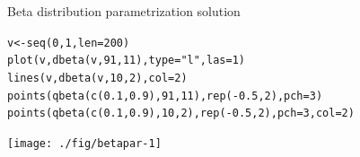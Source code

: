 \documentclass[xcolor=table,           xcolor=dvipsnames]{beamer}\usepackage[]{graphicx}\usepackage[]{color}
\makeatletter
\newcommand{\hlnum}[1]{\textcolor[rgb]{0,0,0}{#1}}
\newcommand{\hlstr}[1]{\textcolor[rgb]{0.545,0.137,0.137}{#1}}
\newcommand{\hlopt}[1]{\textcolor[rgb]{0,0,0}{#1}}
\newcommand{\hlstd}[1]{\textcolor[rgb]{0,0,0}{#1}}
\newcommand{\hlkwb}[1]{\textcolor[rgb]{0,0,0}{#1}}
\newcommand{\hlkwc}[1]{\textcolor[rgb]{1,0,1}{#1}}
\newcommand{\hlkwd}[1]{\textcolor[rgb]{0,0,1}{#1}}
\newenvironment{kframe}{%
 \def\at@end@of@kframe{}%
 \ifinner\ifhmode%
  \def\at@end@of@kframe{\end{minipage}}%
  \begin{minipage}{\columnwidth}%
 \fi\fi%
 \def\FrameCommand##1{\hskip\@totalleftmargin \hskip-\fboxsep
 \colorbox{shadecolor}{##1}\hskip-\fboxsep
     \hskip-\linewidth \hskip-\@totalleftmargin \hskip\columnwidth}%
 \MakeFramed {\advance\hsize-\width
   \@totalleftmargin\z@ \linewidth\hsize
   \@setminipage}}%
 {\par\unskip\endMakeFramed%
 \at@end@of@kframe}
\newenvironment{knitrout}{}{} %
\makeatother
\begin{document}

\begin{frame}[fragile]{Beta distribution parametrization solution}
\vspace{-1em}
\begin{knitrout}
\color{fgcolor}\begin{kframe}
\begin{alltt}
\hlstd{v} \hlkwb{<-} \hlkwd{seq}\hlstd{(}\hlnum{0}\hlstd{,}\hlnum{1}\hlstd{,} \hlkwc{len}\hlstd{=}\hlnum{200}\hlstd{)}
\hlkwd{plot}\hlstd{(v,} \hlkwd{dbeta}\hlstd{(v,} \hlnum{91}\hlstd{,}\hlnum{11}\hlstd{),} \hlkwc{type}\hlstd{=}\hlstr{"l"}\hlstd{,} \hlkwc{las}\hlstd{=}\hlnum{1}\hlstd{)}
\hlkwd{lines}\hlstd{(v,} \hlkwd{dbeta}\hlstd{(v,} \hlnum{10}\hlstd{,}\hlnum{2}\hlstd{),} \hlkwc{col}\hlstd{=}\hlnum{2}\hlstd{)}
\hlkwd{points}\hlstd{(}\hlkwd{qbeta}\hlstd{(}\hlkwd{c}\hlstd{(}\hlnum{0.1}\hlstd{,} \hlnum{0.9}\hlstd{),} \hlnum{91}\hlstd{,}\hlnum{11}\hlstd{),} \hlkwd{rep}\hlstd{(}\hlopt{-}\hlnum{0.5}\hlstd{,}\hlnum{2}\hlstd{),} \hlkwc{pch}\hlstd{=}\hlnum{3}\hlstd{)}
\hlkwd{points}\hlstd{(}\hlkwd{qbeta}\hlstd{(}\hlkwd{c}\hlstd{(}\hlnum{0.1}\hlstd{,} \hlnum{0.9}\hlstd{),} \hlnum{10}\hlstd{,}\hlnum{2}\hlstd{),} \hlkwd{rep}\hlstd{(}\hlopt{-}\hlnum{0.5}\hlstd{,}\hlnum{2}\hlstd{),} \hlkwc{pch}\hlstd{=}\hlnum{3}\hlstd{,} \hlkwc{col}\hlstd{=}\hlnum{2}\hlstd{)}
\end{alltt}
\end{kframe}

{\centering \texttt{[image: ./fig/betapar-1]} 

}



\end{knitrout}
\end{frame}

\end{document}
